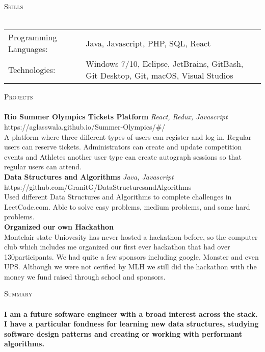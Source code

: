 \documentclass[a4paper]{article}
\newcommand{\lineunder} {
    \vspace*{-8pt} \\
    \hspace*{-18pt} \hrulefill \\
}
\newcommand{\header} [1] {
    {\hspace*{-18pt}\vspace*{6pt} \textsc{#1}}
    \vspace*{-6pt} \lineunder
}
\begin{document}
\header{Skills}
\begin{tabular}{ l l }
	Programming Languages: & Java, Javascript, PHP, SQL, React                                                   \\
	Technologies:          & Windows 7/10, Eclipse, JetBrains, GitBash, Git Desktop, Git, macOS, Visual Studios \\
\end{tabular}
\vspace{2mm}

\header{Projects}
{\textbf{Rio Summer Olympics Tickets Platform}} {\sl React, Redux, Javascript} \hfill https://aglasswala.github.io/Summer-Olympics/\#/\\
A platform where three different types of users can register and log in. Regular users can reserve tickets. Administrators can create and update competition events and Athletes another user type can create autograph sessions so that regular users can attend.\\
\vspace*{2mm}
{\textbf{Data Structures and Algorithms}} {\sl Java, Javascript} \hfill https://github.com/GranitG/DataStructuresandAlgorithms\\
Used different Data Structures and Algorithms to complete challenges in LeetCode.com. Able to solve easy problems, medium problems, and some hard problems.\\
\vspace*{2mm}
{\textbf{Organized our own Hackathon}}\\
Montclair state Uniovesity has never hosted a hackathon before, so the computer club which includes me organized our first ever hackathon that had over 130participants. We had quite a few sponsors including google, Monster and even UPS. Although we were not cerified by MLH we still did the hackathon with the money we fund raised through school and sponsors.\\
\vspace*{2mm}

\header{Summary}
\textbf{I am a future software engineer with a broad interest across the stack. I have a particular fondness for learning new data structures, studying software design patterns and creating or working with performant algorithms.}\\

\vspace*{2mm}

\ 
\end{document}
